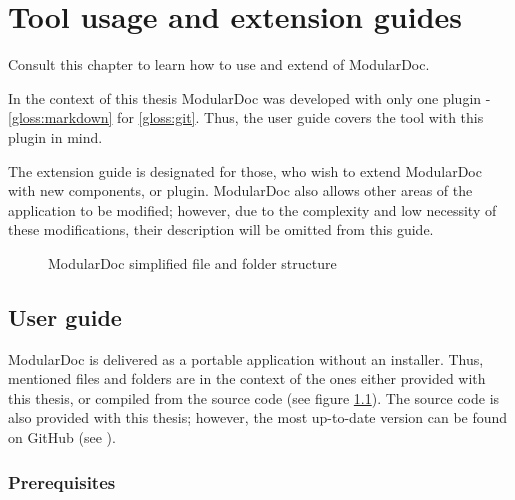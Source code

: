 \chapter{Tool usage and extension guides}

Consult this chapter to learn how to use and extend of ModularDoc.

In the context of this thesis ModularDoc was developed with only one plugin - \ref{gloss:markdown} for \ref{gloss:git}.
Thus, the user guide covers the tool with this plugin in mind.

The extension guide is designated for those, who wish to extend ModularDoc with new components, or plugin. ModularDoc also allows other areas of the application to be modified; however, due to the complexity and low necessity of these modifications, their description will be omitted from this guide.

\begin{figure}[H]
    \caption{ModularDoc simplified file and folder structure}
    \label{fig:applicationFileStructure}
\end{figure}

\section{User guide}

ModularDoc is delivered as a portable application without an installer. Thus, mentioned files and folders are in the context of the ones either provided with this thesis, or compiled from the source code (see figure \ref{fig:applicationFileStructure}). The source code is also provided with this thesis; however, the most up-to-date version can be found on GitHub (see ).


\subsection{Prerequisites}

